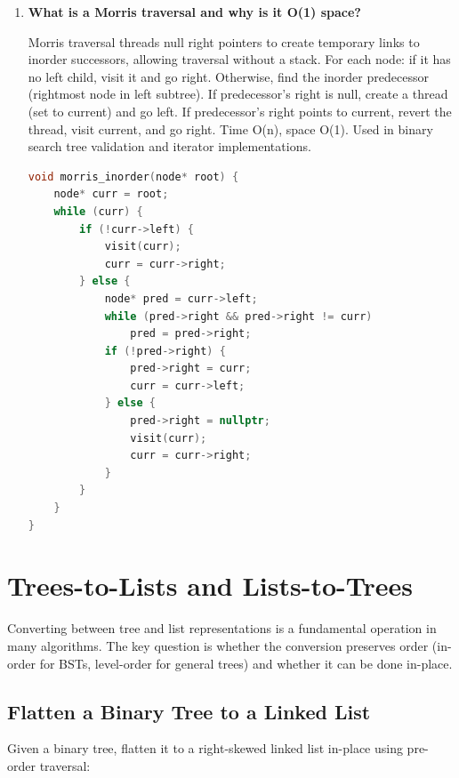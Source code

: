 \begin{enumerate}
\item \textbf{What is a Morris traversal and why is it O(1) space?}

Morris traversal threads null right pointers to create temporary links to inorder successors, allowing traversal without a stack. For each node: if it has no left child, visit it and go right. Otherwise, find the inorder predecessor (rightmost node in left subtree). If predecessor's right is null, create a thread (set to current) and go left. If predecessor's right points to current, revert the thread, visit current, and go right. Time O(n), space O(1). Used in binary search tree validation and iterator implementations.

\begin{lstlisting}[language=C++]
void morris_inorder(node* root) {
    node* curr = root;
    while (curr) {
        if (!curr->left) {
            visit(curr);
            curr = curr->right;
        } else {
            node* pred = curr->left;
            while (pred->right && pred->right != curr)
                pred = pred->right;
            if (!pred->right) {
                pred->right = curr;
                curr = curr->left;
            } else {
                pred->right = nullptr;
                visit(curr);
                curr = curr->right;
            }
        }
    }
}
\end{lstlisting}
\end{enumerate}


\section{Trees-to-Lists and Lists-to-Trees}
\label{sec:trees-to-lists}

Converting between tree and list representations is a fundamental operation in many algorithms. The key question is whether the conversion preserves order (in-order for BSTs, level-order for general trees) and whether it can be done in-place.

\subsection{Flatten a Binary Tree to a Linked List}

Given a binary tree, flatten it to a right-skewed linked list in-place using pre-order traversal:

